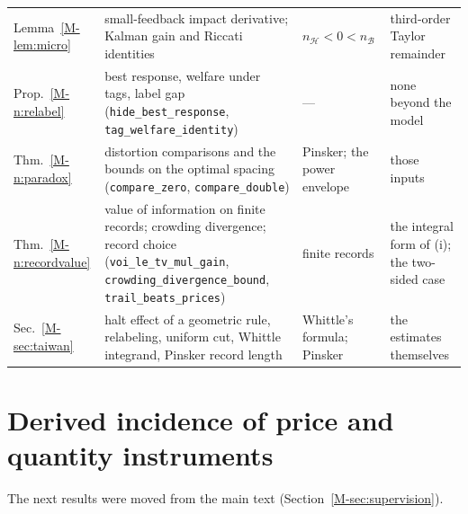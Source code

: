 \documentclass[12pt]{article}
\theoremstyle{definition}
\theoremstyle{remark}
\begin{document}
{\begin{longtable}{>{\raggedright\arraybackslash}p{}>{\raggedright\arraybackslash}p{}>{\raggedright\arraybackslash}p{}>{\raggedright\arraybackslash}p{}}
Lemma~\ref{M-lem:micro} & small-feedback impact derivative; Kalman gain and Riccati identities & $n_{\mathcal H} < 0 < n_{\mathcal B}$ & third-order Taylor remainder\\
Prop.~\ref{M-n:relabel} & best response, welfare under tags, label gap (\texttt{hide\_\allowbreak{}best\_\allowbreak{}response}, \texttt{tag\_\allowbreak{}welfare\_\allowbreak{}identity}) & --- & none beyond the model\\
Thm.~\ref{M-n:paradox} & distortion comparisons and the bounds on the optimal spacing (\texttt{compare\_\allowbreak{}zero}, \texttt{compare\_\allowbreak{}double}) & Pinsker; the power envelope & those inputs\\
Thm.~\ref{M-n:recordvalue} & value of information on finite records; crowding divergence; record choice (\texttt{voi\_\allowbreak{}le\_\allowbreak{}tv\_\allowbreak{}mul\_\allowbreak{}gain}, \texttt{crowding\_\allowbreak{}divergence\_\allowbreak{}bound}, \texttt{trail\_\allowbreak{}beats\_\allowbreak{}prices}) & finite records & the integral form of (i); the two-sided case\\
Sec.~\ref{M-sec:taiwan} & halt effect of a geometric rule, relabeling, uniform cut, Whittle integrand, Pinsker record length & Whittle's formula; Pinsker & the estimates themselves\\
\bottomrule
\end{longtable}
}

\section{Derived incidence of price and quantity instruments}\label{app:instruments}

\noindent The next results were moved from the main text (Section~\ref{M-sec:supervision}).
\end{document}
